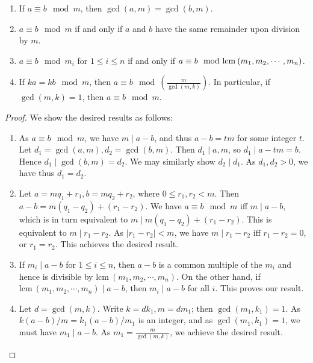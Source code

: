 \begin{pr}
\begin{enumerate}
\item If $a \equiv b\mod{m}$, then $\gcd{(a,m)} = \gcd{(b,m)}$.
\item $a \equiv b\mod{m}$ if and only if $a$ and $b$ have the same remainder upon division by $m$.
\item $a\equiv b\mod{m_i}$ for $1 \le i \le n$ if and only if $a \equiv b\mod{\textup{lcm}\:(m_1,m_2,\cdots,m_n)}$.
\item If $ka = kb\mod{m}$, then $a\equiv b\mod{\left(\frac{m}{\gcd{(m,k)}}\right)}$.  In particular, if $\gcd{(m,k)} = 1$, then $a \equiv b\mod{m}$.
\end{enumerate}
\begin{proof}
We show the desired results as follows:
\begin{enumerate}
\item As $a \equiv b\mod{m}$, we have $m\mid a-b$, and thus $a-b = tm$ for some integer $t$.  Let $d_1 = \gcd{(a,m)}, d_2 = \gcd{(b,m)}$.  Then $d_1 \mid a,m$, so $d_1 \mid a-tm = b$.  Hence $d_1 \mid \gcd{(b,m)} = d_2$.  We may similarly show $d_2 \mid d_1$.  As $d_1, d_2 > 0$, we have thus $d_1 = d_2$.
\item Let $a = mq_1+r_1, b = mq_2+r_2$, where $0 \le r_1, r_2 < m$.  Then $a-b = m(q_1-q_2)+(r_1-r_2)$.  We have $a \equiv b\mod{m}$ iff $m \mid a-b$, which is in turn equivalent to $m \mid m(q_1-q_2)+(r_1-r_2)$.  This is equivalent to $m \mid r_1-r_2$.  As $|r_1-r_2| < m$, we have $m \mid r_1-r_2$ iff $r_1 - r_2 = 0$, or $r_1 = r_2$.  This achieves the desired result.
\item If $m_i \mid a-b$ for $1 \le i \le n$, then $a-b$ is a common multiple of the $m_i$ and hence is divisible by $\text{lcm}\:(m_1,m_2,\cdots,m_n)$.  On the other hand, if $\text{lcm}\:(m_1,m_2,\cdots,m_n) \mid a-b$, then $m_i \mid a-b$ for all $i$.  This proves our result.
\item Let $d = \gcd{(m,k)}$.  Write $k = dk_1, m = dm_1$; then $\gcd{(m_1,k_1)} = 1$.  As $k(a-b)/m = k_1(a-b)/m_1$ is an integer, and as $\gcd{(m_1,k_1)} = 1$, we must have $m_1 \mid a-b$.  As $m_1 = \frac{m}{\gcd{(m,k)}}$, we achieve the desired result.
\end{enumerate}
\end{proof}
\end{pr}
